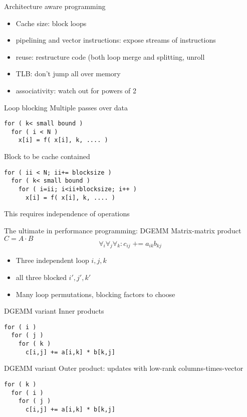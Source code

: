\begin{frame}{Architecture aware programming}
  \begin{itemize}
  \item Cache size: block loops
  \item pipelining and vector instructions: expose streams of instructions
  \item reuse: restructure code (both loop merge and splitting, unroll
  \item TLB: don't jump all over memory
  \item associativity: watch out for powers of 2
  \end{itemize}
\end{frame}

\begin{frame}[fragile]{Loop blocking}
Multiple passes over data
\begin{verbatim}
for ( k< small bound )
  for ( i < N )
    x[i] = f( x[i], k, .... )
\end{verbatim}
Block to be cache contained
\begin{verbatim}
for ( ii < N; ii+= blocksize )
  for ( k< small bound )
    for ( i=ii; i<ii+blocksize; i++ )
      x[i] = f( x[i], k, .... )
\end{verbatim}
This requires independence of operations
\end{frame}

\begin{frame}{The ultimate in performance programming: DGEMM}
  Matrix-matrix product $C=A\cdot B$
  \[ \forall_i\forall_j\forall_k\colon c_{ij}\mathop{+=} a_{ik}b_{kj} \]
  \begin{itemize}
  \item Three independent loop $i,j,k$
  \item all three blocked $i',j',k'$
  \item Many loop permutations, blocking factors to choose
  \end{itemize}
\end{frame}

\begin{frame}[fragile]{DGEMM variant}
Inner products
\begin{verbatim}
for ( i )
  for ( j )
    for ( k )
      c[i,j] += a[i,k] * b[k,j]
\end{verbatim}
\end{frame}

\begin{frame}[fragile]{DGEMM variant}
Outer product: updates with low-rank columns-times-vector
\begin{verbatim}
for ( k )
  for ( i )
    for ( j )
      c[i,j] += a[i,k] * b[k,j]
\end{verbatim}
\end{frame}

